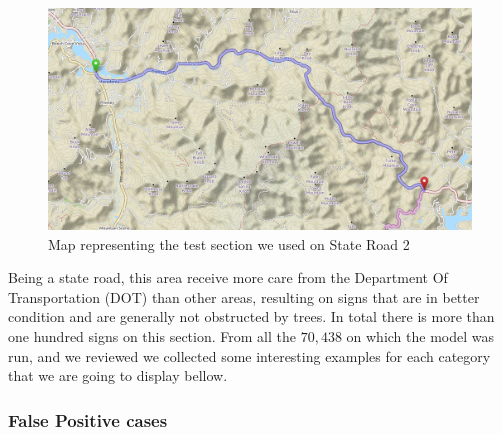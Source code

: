 \begin{figure}
    \centering
    \includegraphics[width=0.8\linewidth]{figures/map_sr2.png}
    \caption{Map representing the test section we used on State Road 2}
    \label{fig:map_sr2}
\end{figure}{}

Being a state road, this area receive more care from the Department Of Transportation (DOT) than other areas, resulting on signs that are in better condition and are generally not obstructed by trees. In total there is more than one hundred signs on this section. From all the $70,438$ on which the model was run, and we reviewed we collected some interesting examples for each category that we are going to display bellow.

\subsubsection{False Positive cases}


